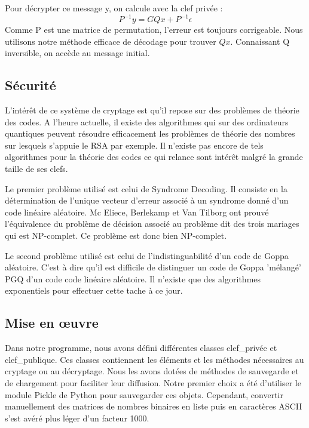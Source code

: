 \documentclass{article}
\begin{document}
			Pour décrypter ce message y, on calcule avec la clef privée :
			$$
				P^{-1}y = GQx + P^{-1}\epsilon
			$$
			Comme P est une matrice de permutation, l'erreur est toujours corrigeable.
			Nous utilisons notre méthode efficace de décodage pour trouver $Qx$.
			Connaissant Q inversible, on accède au message initial.


		\subsection*{Sécurité}
			 L'intérêt de ce système de cryptage est qu'il repose sur des problèmes de théorie des codes.
			 A l'heure actuelle, il existe des algorithmes qui sur des ordinateurs quantiques peuvent résoudre efficacement les problèmes de théorie des nombres sur lesquels s’appuie le RSA par exemple.
			 Il n'existe pas encore de tels algorithmes pour la théorie des codes ce qui relance sont intérêt malgré la grande taille de ses clefs.

			 Le premier problème utilisé est celui de Syndrome Decoding.
			 Il consiste en la détermination de l'unique vecteur d'erreur associé à un syndrome donné d'un code linéaire aléatoire.
			 Mc Eliece, Berlekamp et Van Tilborg ont prouvé l'équivalence du problème de décision associé au problème dit des trois mariages qui est NP-complet.
			 Ce problème est donc bien NP-complet.

			 Le second problème utilisé est celui de l'indistinguabilité d'un code de Goppa aléatoire.
			 C'est à dire qu'il est difficile de distinguer un code de Goppa 'mélangé' PGQ d'un code code linéaire aléatoire.
			 Il n'existe que des algorithmes exponentiels pour effectuer cette tache à ce jour.

		\subsection*{Mise en œuvre}
			Dans notre programme, nous avons défini différentes classes clef\_privée et clef\_publique.
			Ces classes contiennent les éléments et les méthodes nécessaires au cryptage ou au décryptage.
			Nous les avons dotées de méthodes de sauvegarde et de chargement pour faciliter leur diffusion.
			Notre premier choix a été d'utiliser le module Pickle de Python pour sauvegarder ces objets.
			Cependant, convertir manuellement des matrices de nombres binaires en liste puis en caractères ASCII s'est avéré plus léger d'un facteur 1000.
\end{document}
